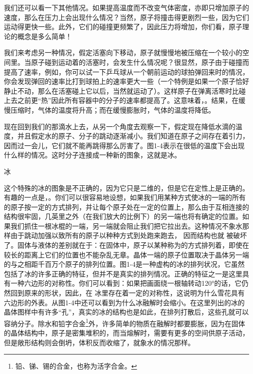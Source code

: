 \documentclass[12pt,oneside]{book}
\begin{document}
我们还可以看一下其他情况。如果提高温度而不改变气体密度，亦即只增加原子的速度，那么在压力上会出现什么情况？当然，原子将撞击得更剧烈一些，因为它们运动得更快一些。此外，它们的碰撞更频繁了，因此压力将增加，你们看，原子理论的概念是多么简单！

我们来考虑另一种情况，假定活塞向下移动，原子就慢慢地被压缩在一个较小的空间里。当原子碰到运动着的活塞时，会发生什么情况呢？很显然，原子由于碰撞而提高了速率，例如，你可以试一下乒乓球从一个朝前运动的球拍弹回来时的情况，你会发现弹回的速率比打到球拍上的速率更大一些（一个特例是如果一个原子恰好静止不动，那么在活塞碰上它以后，当然就运动了）。这样原子在弹离活寒时比碰上去之前更“热”因此所有容器中的分子的速率都提高了。这意味着，。结果，在缓慢压缩时，气体的温度将升高；而在缓慢膨胀时，气体的温度将降低。

现在回到我们的那滴水上去，从另一个角度去观察一下，假定现在降低水滴的温度，并且假定水的原子、分子的跳动逐渐减小。我们知道在原子之间存在着引力，因而过一会儿，它们就不能再跳得那么厉害了。图1-4表示在很低的温度下会出现什么样的情况。这时分子连接成一种新的图象，这就是冰。
\begin{fig}{冰}
\caption{冰}
\label{fig:冰}
\end{fig}
这个特殊的冰的图象是不正确的，因为它只是二维的，但是它在定性上是正确的。有趣的一点是，。你们可以很容易地设想，如果我们用某种方式使冰的一端的所有的原子按一定的方式排列，并让每个原子处在一定的位置上，那么由于互相连接的结构很牢固，几英里之外（在我们放大的比例下）的另一端也将有确定的位置。如果我们抓住一根冰棍的一端，另一端就会阻止我们把它拉出去。这种情况不象水那样由于跳动加强以致所有的原子以种种方式到处跑来跑去， 因而结构也就
被破坏了。固体与液体的差别就在于：在固体中，原子以某种称为的方式排列着，即使在较长的距离上它们的位置也不能杂乱无章。晶体一端的原子位置取决于晶体另一端的与之相距千百万个原子的排列位置。图1-4是一种虚构的冰的排列状况，它虽然包括了冰的许多正确的特征，但并不是真实的排列情况。正确的特征之一是这里具有一种六边形的对称性。你们可以看到：如果把画面绕一根轴转动120°的话，它仍然回到原来的形状，因此，在
冰里存在着一定的对称性，这说明为什么雪花具有六边形的外表。从图1-4中还可以看到为什么冰融解时会缩小。在这里列出的冰的晶体图样中有许多“孔”，真实的冰的结构也是如此，在排列打散后，这些孔就可以容纳分子。除水和铅字合金\footnote{铅、锑、锡的合金，也称为活字合金。}外，许多简单的物质在融解时都要膨胀，因为在固体的晶体结构中，原子是密集堆积的，而当熔解时，需要有更多的空间供原子活动，但是敞形结构则会倒坍，体积反而收缩了，就象水的情况那样。
\end{document}
